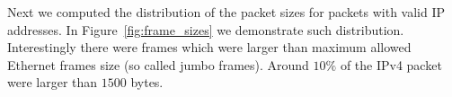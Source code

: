 Next we computed the distribution of the packet sizes for packets with valid IP addresses. {\eat In Figure~\ref{fig:frame_sizes} 
we demonstrate such distribution. Interestingly there were frames which were larger than maximum allowed Ethernet frames 
size (so called jumbo frames).} Around $10\%$ of the IPv4 packet were larger than $1500$ bytes. 

